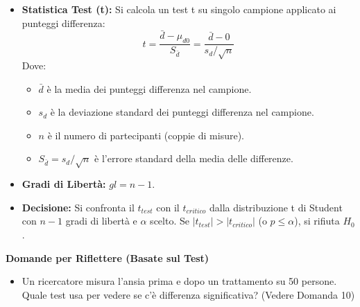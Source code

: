 \documentclass[12pt, a4paper]{article}
\newenvironment{reflectionbox}{%
    \medskip
    \begin{framed}\par\noindent
    \textbf{\color{boxtitlecolor}Domande per Riflettere (Basate sul Test)} \par
    \begin{itemize}[leftmargin=*, label=$\blacktriangleright$]
}{%
    \end{itemize}\par
    \end{framed}
    \medskip
}
\newcommand{\alphaerr}{\alpha} %
\newcommand{\Hnull}{H_0} %
\newcommand{\df}{gl} %
\begin{document}
\begin{itemize}
    \item \textbf{Statistica Test (t):} Si calcola un test t su singolo campione applicato ai punteggi differenza:
        $$ t = \frac{\bar{d} - \mu_{d0}}{S_{\bar{d}}} = \frac{\bar{d} - 0}{s_d / \sqrt{n}} $$
        Dove:
        \begin{itemize}
            \item $\bar{d}$ è la media dei punteggi differenza nel campione.
            \item $s_d$ è la deviazione standard dei punteggi differenza nel campione.
            \item $n$ è il numero di partecipanti (coppie di misure).
            \item $S_{\bar{d}} = s_d / \sqrt{n}$ è l'errore standard della media delle differenze.
        \end{itemize}
    \item \textbf{Gradi di Libertà:} $\df = n - 1$.
    \item \textbf{Decisione:} Si confronta il $t_{test}$ con il $t_{critico}$ dalla distribuzione t di Student con $n-1$ gradi di libertà e $\alphaerr$ scelto. Se $|t_{test}| > |t_{critico}|$ (o $p \le \alphaerr$), si rifiuta $\Hnull$.
\end{itemize}

\begin{reflectionbox}
    \item Un ricercatore misura l'ansia prima e dopo un trattamento su 50 persone. Quale test usa per vedere se c'è differenza significativa? (Vedere Domanda 10)
\end{reflectionbox}
\end{document}
